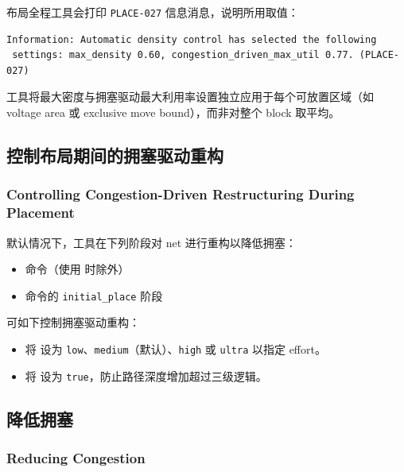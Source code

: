 布局全程工具会打印 \texttt{PLACE-027} 信息消息，说明所用取值：
\begin{lstlisting}
Information: Automatic density control has selected the following
 settings: max_density 0.60, congestion_driven_max_util 0.77. (PLACE-027)
\end{lstlisting}

工具将最大密度与拥塞驱动最大利用率设置独立应用于每个可放置区域（如 voltage area 或 exclusive move bound），而非对整个 block 取平均。

\subsection{控制布局期间的拥塞驱动重构}
\subsubsection*{Controlling Congestion-Driven Restructuring During Placement}

默认情况下，工具在下列阶段对 net 进行重构以降低拥塞：
\begin{itemize}
  \item {} 命令（使用  时除外）
  \item {} 命令的 \texttt{initial\_place} 阶段
\end{itemize}

可如下控制拥塞驱动重构：
\begin{itemize}
  \item 将  设为 \texttt{low}、\texttt{medium}（默认）、\texttt{high} 或 \texttt{ultra} 以指定 effort。
  \item 将  设为 \texttt{true}，防止路径深度增加超过三级逻辑。
\end{itemize}

\subsection{降低拥塞}
\subsubsection*{Reducing Congestion}

